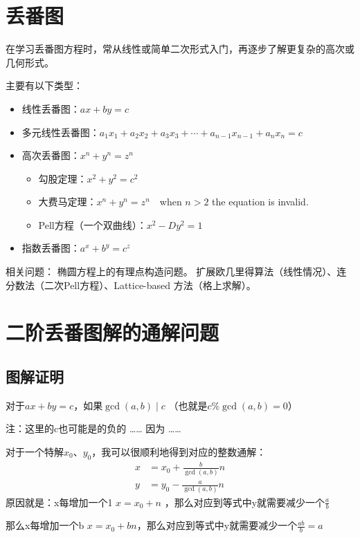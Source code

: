 \documentclass[12pt]{article}
\begin{document}
\section{丢番图}
在学习丢番图方程时，常从线性或简单二次形式入门，再逐步了解更复杂的高次或几何形式。

主要有以下类型：
\begin{itemize}
    \item 线性丢番图：$ax+by=c$
    \item 多元线性丢番图：$a_{1}x_{1}+a_{2}x_{2}+a_{3}x_{3}+\cdots+a_{n-1}x_{n-1}+a_{n}x_{n}=c$
    \item 高次丢番图：$x^{n}+y^{n}=z^{n}$
    \begin{itemize}
        \item 勾股定理：$x^{2}+y^{2}=c^{2}$
        \item 大费马定理：$x^{n}+y^{n}=z^{n}\quad $when $n>2$ the equation is invalid.
        \item Pell方程（一个双曲线）：$x^{2}-Dy^{2}=1$
    \end{itemize}
    \item 指数丢番图：$a^{x}+b^{y}=c^{z}$
\end{itemize}

相关问题：
椭圆方程上的有理点构造问题。
扩展欧几里得算法（线性情况）、连分数法（二次Pell方程）、Lattice-based 方法（格上求解）。

\section{二阶丢番图解的通解问题}

\subsection{图解证明}

对于$ax + by = c$，如果\(\gcd(a,b) \mid c\) （也就是$c \% \gcd(a,b) = 0$）

注：这里的c也可能是的负的 …… 因为 …… 

对于一个特解$x_{0}$、$y_{0}$，我可以很顺利地得到对应的整数通解：
\begin{align*}
    x&=x_{0}+\frac{b}{\gcd(a,b)}n\\
    y&=y_{0}-\frac{a}{\gcd(a,b)}n
\end{align*}
原因就是：x每增加一个1 $x=x_{0}+n$ ，那么对应到等式中y就需要减少一个$\frac{a}{b}$

那么x每增加一个b $x=x_{0}+bn$，那么对应到等式中y就需要减少一个$\frac{ab}{b}=a$
\end{document}
